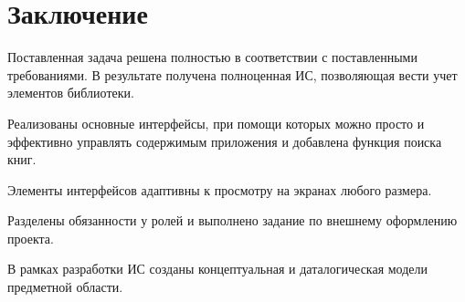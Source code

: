 \section{Заключение}

Поставленная задача решена полностью в соответствии
с поставленными требованиями. В результате получена
полноценная ИС, позволяющая вести учет элементов библиотеки.

Реализованы основные интерфейсы, при помощи которых можно просто и
эффективно управлять содержимым приложения и добавлена функция
поиска книг.

Элементы интерфейсов адаптивны к просмотру на экранах
любого размера.

Разделены обязанности у ролей и выполнено задание по
внешнему оформлению проекта.

В рамках разработки ИС созданы концептуальная и даталогическая
модели предметной области.
